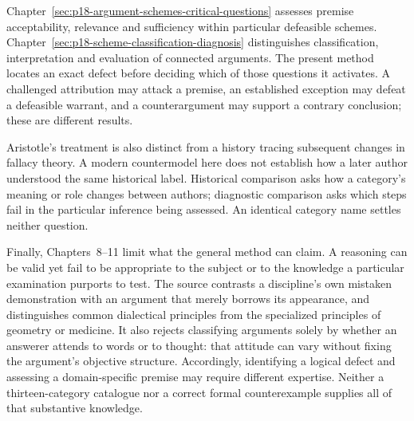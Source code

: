 Chapter~\ref{sec:p18-argument-schemes-critical-questions} assesses
premise acceptability, relevance and sufficiency within particular
defeasible schemes. Chapter~\ref{sec:p18-scheme-classification-diagnosis}
distinguishes classification, interpretation and evaluation of connected
arguments. The present method locates an exact defect before deciding
which of those questions it activates. A challenged attribution may
attack a premise, an established exception may defeat a defeasible
warrant, and a counterargument may support a contrary conclusion;
these are different results.

Aristotle's treatment is also distinct from a history tracing subsequent
changes in fallacy theory. A modern countermodel here does not establish
how a later author understood the same historical label. Historical
comparison asks how a category's meaning or role changes between
authors; diagnostic comparison asks which steps fail in the particular
inference being assessed. An identical category name settles neither
question.

Finally, Chapters~8--11 limit what the general method can claim. A
reasoning can be valid yet fail to be appropriate to the subject or
to the knowledge a particular examination purports to test. The source
contrasts a discipline's own mistaken demonstration with an argument
that merely borrows its appearance, and distinguishes common dialectical
principles from the specialized principles of geometry or medicine.
It also rejects classifying arguments solely by whether an answerer
attends to words or to thought: that attitude can vary without fixing
the argument's objective structure. Accordingly, identifying a logical
defect and assessing a domain-specific premise may require different
expertise. Neither a thirteen-category catalogue nor a correct formal
counterexample supplies all of that substantive knowledge.
